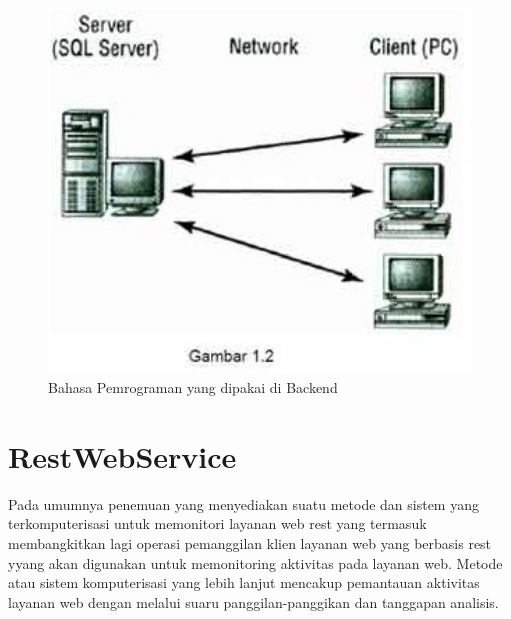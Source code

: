 {\begin{figure}[ht]
    \centerline{\includegraphics[width=1\textwidth]{figures/2model2tier}}
    \caption{Bahasa Pemrograman yang dipakai di Backend}
    \label{2Tier2}
\end{figure}

\section{RestWebService}
Pada umumnya penemuan yang menyediakan suatu metode dan sistem yang terkomputerisasi untuk memonitori layanan web rest yang termasuk membangkitkan lagi operasi pemanggilan klien layanan web yang berbasis rest yyang akan digunakan untuk memonitoring aktivitas pada layanan web. Metode atau sistem komputerisasi yang lebih lanjut mencakup pemantauan aktivitas layanan web dengan melalui suaru panggilan-panggikan dan tanggapan analisis.

}
